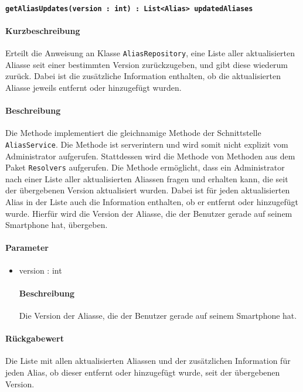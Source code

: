 \paragraph{\texttt{getAliasUpdates(version : int) : List<Alias> updatedAliases}}%
\paragraph*{Kurzbeschreibung}
Erteilt die Anweisung an Klasse \texttt{AliasRepository}, eine Liste aller aktualisierten Aliasse seit einer bestimmten Version zurückzugeben, und gibt diese wiederum zurück. Dabei ist die zusätzliche Information enthalten, ob die aktualisierten Aliasse jeweils entfernt oder hinzugefügt wurden.
\paragraph*{Beschreibung}
Die Methode implementiert die gleichnamige Methode der Schnittstelle \texttt{AliasService}.
Die Methode ist serverintern und wird somit nicht explizit vom Administrator aufgerufen.
Stattdessen wird die Methode von Methoden aus dem Paket \texttt{Resolvers} aufgerufen.
Die Methode ermöglicht, dass ein Administrator nach einer Liste aller aktualisierten Aliassen fragen und erhalten kann, die seit der übergebenen Version aktualisiert wurden.
Dabei ist für jeden aktualisierten Alias in der Liste auch die Information enthalten, ob er entfernt oder hinzugefügt wurde.
Hierfür wird die Version der Aliasse, die der Benutzer gerade auf seinem Smartphone hat, übergeben.
\paragraph*{Parameter}
\begin{itemize}
    \item version : int
    		\paragraph*{Beschreibung}
    		Die Version der Aliasse, die der Benutzer gerade auf seinem Smartphone hat.
\end{itemize}
\paragraph*{Rückgabewert}
Die Liste mit allen aktualisierten Aliassen und der zusätzlichen Information für jeden Alias, ob dieser entfernt oder hinzugefügt wurde, seit der übergebenen Version.
